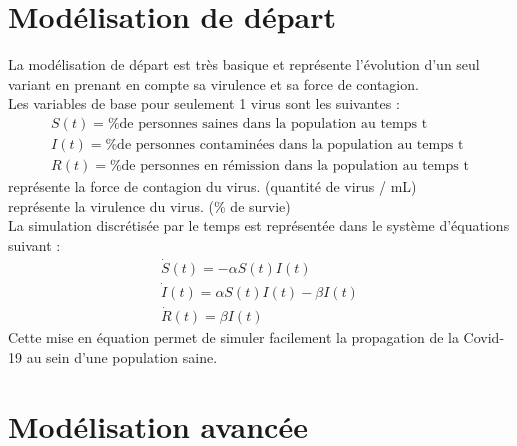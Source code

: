 \documentclass{article}
\begin{document}
\section{Modélisation de départ}

La modélisation de départ est très basique et représente l'évolution d'un seul variant en prenant en compte sa virulence et sa force de contagion.\\
\noindent
Les variables de base pour seulement 1 virus sont les suivantes :
\begin{align}
    S(t)= \text{\% de personnes saines dans la population au temps t} \\
    I(t)= \text{\% de personnes contaminées dans la population au temps t} \\
    R(t)= \text{\% de personnes en rémission dans la population au temps t}
\end{align}
\noindent
\textalpha \space représente la force de contagion du virus. (quantité de virus / mL) \\
\textbeta \space représente la virulence du virus. (\% de survie) \\
\noindent
La simulation discrétisée par le temps est représentée dans le système d'équations suivant :
\begin{align}
    \dot{S}(t)= -\alpha S(t)I(t) \\
    \dot{I}(t)= \alpha S(t)I(t)-\beta I(t) \\
    \dot{R}(t)= \beta I(t)
\end{align}
\noindent
Cette mise en équation permet de simuler facilement la propagation de la Covid-19 au sein d'une population saine.\\

\section{Modélisation avancée}
\end{document}
